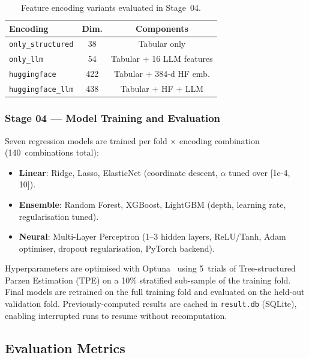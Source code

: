 \documentclass[11pt,twocolumn]{article}
\newcommand{\enc}[1]{\texttt{#1}}
\begin{document}
\begin{table}[H]
\centering
\caption{Feature encoding variants evaluated in Stage~04.}
\label{tab:encodings}
\small
\begin{tabular}{lcc}
\toprule
\textbf{Encoding} & \textbf{Dim.} & \textbf{Components} \\
\midrule
\enc{only\_structured}  &  38 & Tabular only \\
\enc{only\_llm}         &  54 & Tabular + 16 LLM features \\
\enc{huggingface}       & 422 & Tabular + 384-d HF emb. \\
\enc{huggingface\_llm}  & 438 & Tabular + HF + LLM \\
\bottomrule
\end{tabular}
\end{table}

\subsubsection{Stage 04 — Model Training and Evaluation}
Seven regression models are trained per fold × encoding combination
(140~combinations total):

\begin{itemize}
  \item \textbf{Linear}: Ridge, Lasso, ElasticNet (coordinate descent,
        $\alpha$ tuned over [1e-4, 10]).
  \item \textbf{Ensemble}: Random Forest, XGBoost, LightGBM (depth, learning
        rate, regularisation tuned).
  \item \textbf{Neural}: Multi-Layer Perceptron (1--3 hidden layers,
        ReLU/Tanh, Adam optimiser, dropout regularisation, PyTorch backend).
\end{itemize}

Hyperparameters are optimised with Optuna~\cite{akiba2019} using 5~trials of
Tree-structured Parzen Estimation (TPE) on a 10\% stratified sub-sample of the
training fold.  Final models are retrained on the full training fold and evaluated
on the held-out validation fold.  Previously-computed results are cached in
\texttt{result.db} (SQLite), enabling interrupted runs to resume without recomputation.

\subsection{Evaluation Metrics}
\label{sec:metrics}
\end{document}
